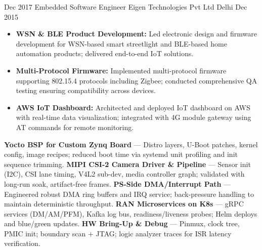\begin{experiences}
  \experience
  {Dec 2017}   %
  {Embedded Software Engineer}  %
  {Eigen Technologies Pvt Ltd}  %
  {Delhi}  %
  {Dec 2015}  %
  {   %
      \begin{itemize}
          \item \textbf{WSN \& BLE Product Development:} Led electronic design and firmware development for WSN-based smart streetlight and BLE-based home automation products; delivered end-to-end IoT solutions.
          \item \textbf{Multi-Protocol Firmware:} Implemented multi-protocol firmware supporting 802.15.4 protocols including Zigbee; conducted comprehensive QA testing ensuring compatibility across devices.
          \item \textbf{AWS IoT Dashboard:} Architected and deployed IoT dashboard on AWS with real-time data visualization; integrated with 4G module gateway using AT commands for remote monitoring.
      \end{itemize}    
  }
  {}  %

    
\end{experiences}

\textbf{Yocto BSP for Custom Zynq Board} — Distro layers, U-Boot patches, kernel config, image recipes; reduced boot time via systemd unit profiling and init sequence trimming. 
\newline
\textbf{MIPI CSI-2 Camera Driver \& Pipeline} — Sensor init (I2C), CSI lane timing, V4L2 sub-dev, media controller graph; validated with long-run soak, artifact-free frames.
\newline
\textbf{PS-Side DMA/Interrupt Path} — Engineered robust DMA ring buffers and IRQ service; back-pressure handling to maintain deterministic throughput.
\newline
\textbf{RAN Microservices on K8s} — gRPC services (DM/AM/PFM), Kafka log bus, readiness/liveness probes; Helm deploys and blue/green updates.
\newline
\textbf{HW Bring-Up \& Debug} — Pinmux, clock tree, PMIC init; boundary scan + JTAG; logic analyzer traces for ISR latency verification.